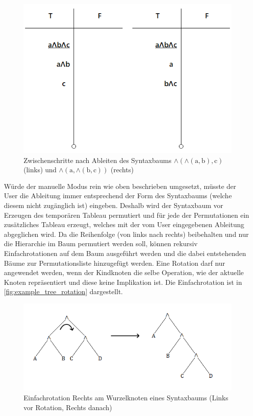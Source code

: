 \begin{figure}[H]
\begin{center}
\includegraphics[scale=0.7]{images/example_different_syntax_trees.png}
\caption{Zwischenschritte nach Ableiten des Syntaxbaums $\wedge(\wedge(\textrm{a},\textrm{b}),\textrm{c})$ (links) und $\wedge(\textrm{a},\wedge(\textrm{b},\textrm{c}))$ (rechts)}
\label{fig:example_different_syntax_trees}
\end{center}
\end{figure}

Würde der manuelle Modus rein wie oben beschrieben umgesetzt, müsste der User die Ableitung immer entsprechend der Form des Syntaxbaums (welche diesem nicht zugänglich ist) eingeben. Deshalb wird der Syntaxbaum vor Erzeugen des temporären Tableau permutiert und für jede der Permutationen ein zusätzliches Tableau erzeugt, welches mit der vom User eingegebenen Ableitung abgeglichen wird. Da die Reihenfolge (von links nach rechts) beibehalten und nur die Hierarchie im Baum permutiert werden soll, können rekursiv Einfachrotationen auf dem Baum ausgeführt werden und die dabei entstehenden Bäume zur Permutationsliste hinzugefügt werden. Eine Rotation darf nur angewendet werden, wenn der Kindknoten die selbe Operation, wie der aktuelle Knoten repräsentiert und diese keine Implikation ist. Die Einfachrotation ist in \autoref{fig:example_tree_rotation} dargestellt.

\begin{figure}[H]
\begin{center}
\includegraphics[scale=0.7]{images/example_tree_rotation.png}
\caption{Einfachrotation Rechts am Wurzelknoten eines Syntaxbaums (Links vor Rotation, Rechts danach)}
\label{fig:example_tree_rotation}
\end{center}
\end{figure}

